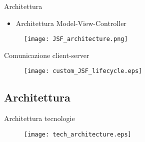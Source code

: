 \begin{frame}{Architettura}

\begin{itemize}
\item Architettura Model-View-Controller
\end{itemize}

\begin{figure}
	\centering
	\texttt{[image: JSF\_architecture.png]}
\end{figure}

\end{frame}


\begin{frame}{Comunicazione client-server}
\begin{figure}
	\centering
	\texttt{[image: custom\_JSF\_lifecycle.eps]}
\end{figure}

\end{frame}


\subsection{Architettura}

\begin{frame}{Architettura tecnologie}
\begin{figure}
	\centering
	\texttt{[image: tech\_architecture.eps]}
\end{figure}
\end{frame}



